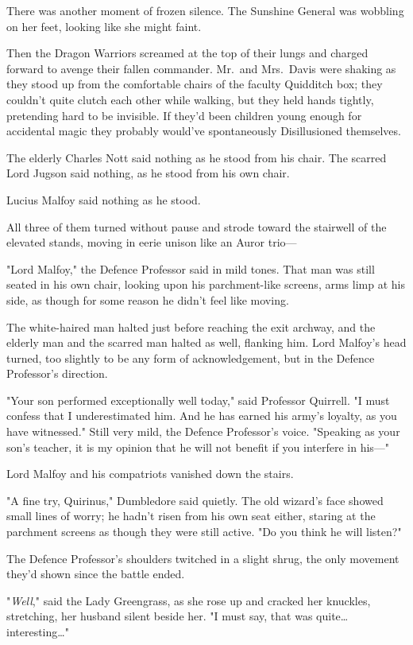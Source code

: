 There was another moment of frozen silence. The Sunshine General was wobbling
on her feet, looking like she might faint.

Then the Dragon Warriors screamed at the top of their lungs and charged forward
to avenge their fallen commander.
\later
Mr.~and Mrs.~Davis were shaking as they stood up from the comfortable chairs of
the faculty Quidditch box; they couldn't quite clutch each other while walking,
but they held hands tightly, pretending hard to be invisible. If they'd been
children young enough for accidental magic they probably would've spontaneously
Disillusioned themselves.

The elderly Charles Nott said nothing as he stood from his chair. The scarred
Lord Jugson said nothing, as he stood from his own chair.

Lucius Malfoy said nothing as he stood.

All three of them turned without pause and strode toward the stairwell of the
elevated stands, moving in eerie unison like an Auror trio---

"Lord Malfoy," the Defence Professor said in mild tones. That man was still
seated in his own chair, looking upon his parchment-like screens, arms limp at
his side, as though for some reason he didn't feel like moving.

The white-haired man halted just before reaching the exit archway, and the
elderly man and the scarred man halted as well, flanking him. Lord Malfoy's
head turned, too slightly to be any form of acknowledgement, but in the Defence
Professor's direction.

"Your son performed exceptionally well today," said Professor Quirrell. "I must
confess that I underestimated him. And he has earned his army's loyalty, as you
have witnessed." Still very mild, the Defence Professor's voice. "Speaking as
your son's teacher, it is my opinion that he will not benefit if you interfere
in his---"

Lord Malfoy and his compatriots vanished down the stairs.

"A fine try, Quirinus," Dumbledore said quietly. The old wizard's face showed
small lines of worry; he hadn't risen from his own seat either, staring at the
parchment screens as though they were still active. "Do you think he will
listen?"

The Defence Professor's shoulders twitched in a slight shrug, the only movement
they'd shown since the battle ended.

"\emph{Well}," said the Lady Greengrass, as she rose up and cracked her
knuckles, stretching, her husband silent beside her. "I must say, that was
quite{\ldots} interesting{\ldots}"

